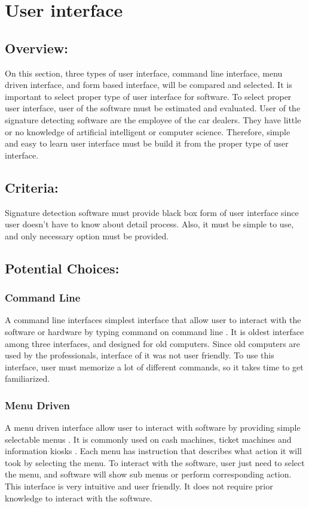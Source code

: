 \documentclass[onecolumn, draftclsnofoot,10pt, compsoc]{IEEEtran}
\begin{document}
\section{User interface}
\subsection{Overview:}
On this section, three types of user interface, command line interface, menu driven interface, and form based interface, will be compared and selected. It is important to select proper type of user interface for software. To select proper user interface, user of the software must be estimated and evaluated. User of the signature detecting software are the employee of the car dealers. They have little or no knowledge of artificial intelligent or computer science. Therefore, simple and easy to learn user interface must be build it from the proper type of user interface.

\subsection{Criteria:}
Signature detection software must provide black box form of user interface since user doesn\rq t have to know about detail process. Also, it must be simple to use, and only necessary option must be provided.

\subsection{Potential Choices:}
\subsubsection{Command Line}
A command line interfaces simplest interface that allow user to interact with the software or hardware by typing command on command line \cite{UIM}. It is oldest interface among three interfaces, and designed for old computers. Since old computers are used by the professionals, interface of it was not user friendly. To use this interface, user must memorize a lot of different commands, so it takes time to get familiarized.

\subsubsection{Menu Driven}
A menu driven interface allow user to interact with software by providing simple selectable menus \cite{UIM}. It is commonly used on cash machines, ticket machines and information kiosks \cite{UIM}. Each menu has instruction that describes what action it will took by selecting the menu. To interact with the software, user just need to select the menu, and software will show sub menus or perform corresponding action. This interface is very intuitive and user friendly. It does not require prior knowledge to interact with the software.
\end{document}
